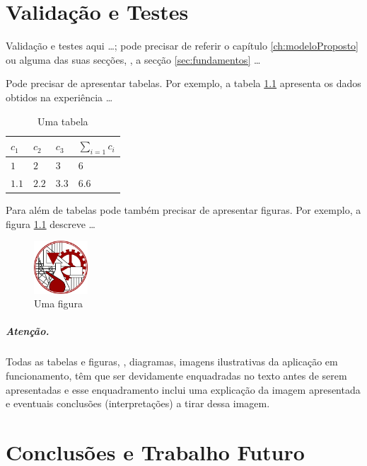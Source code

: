 \chapter{Validação e Testes}
\label{ch:validacaoTestes}

Validação e testes aqui \ldots; pode precisar de referir o capítulo \ref{ch:modeloProposto} ou alguma das suas secções, \eg, a secção \ref{sec:fundamentos} \ldots

Pode precisar de apresentar tabelas. Por exemplo, a tabela \ref{tab:umaTabela} apresenta os dados obtidos na experiência \ldots
\begin{table}[h]
   \centering
   \begin{tabular}{l|l|l|l}
      $c_1$ & $c_2$ & $c_3$ & $\sum_{i=1} c_i$
      \\
      \hline \hline
      $1$ & $2$ & $3$ & $6$
      \\ \hline
      $1.1$ & $2.2$ & $3.3$ & $6.6$
      \\
      \hline \hline
   \end{tabular}
\caption{Uma tabela}
\label{tab:umaTabela}
\end{table}

Para além de tabelas pode também precisar de apresentar figuras. Por exemplo, a figura \ref{fig:umafigura} descreve \ldots
\begin{figure}[h]
   \centering
   \includegraphics[width=2cm]{./fig_logo_ISEL}
\caption{Uma figura}
\label{fig:umafigura}
\end{figure}

\paragraph{Atenção.} Todas as tabelas e figuras, \eg, diagramas, imagens ilustrativas da aplicação em funcionamento, têm que ser devidamente enquadradas no texto antes de serem apresentadas e esse enquadramento inclui uma explicação da imagem apresentada e eventuais conclusões (interpretações) a tirar dessa imagem.


\chapter{Conclusões e Trabalho Futuro}
\label{ch:conclusoesTrabalhoFuturo}

